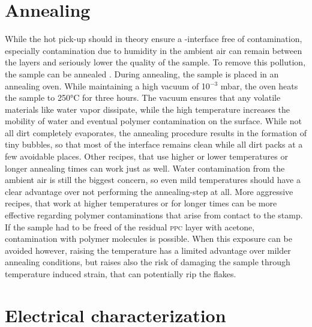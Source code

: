 \section{Annealing}

While the hot pick-up should in theory ensure a \hbn-\tmdg interface free of contamination, especially contamination due to humidity in the ambient air can remain between the layers and seriously lower the quality of the sample. To remove this pollution, the sample can be annealed \cite{lin_graphene_2012}. During annealing, the sample is placed in an annealing oven. While maintaining a high vacuum of 10$^{-3}$ mbar, the oven heats the sample to 250°C for three hours. The vacuum ensures that any volatile materials like water vapor dissipate, while the high temperature increases the mobility of water and eventual polymer contamination on the surface. While not all dirt completely evaporates, the annealing procedure results in the formation of tiny bubbles, so that most of the interface remains clean while all dirt packs at a few avoidable places. Other recipes, that use higher or lower temperatures or longer annealing times can work just as well. Water contamination from the ambient air is still the biggest concern, so even mild temperatures should have a clear advantage over not performing the annealing-step at all. 
More aggressive recipes, that work at higher temperatures or for longer times can be more effective regarding polymer contaminations that arise from contact to the stamp. If the sample had to be freed of the residual \textsc{ppc} layer with acetone, contamination with polymer molecules is possible. When this exposure can be avoided however, raising the temperature has a limited advantage over milder annealing conditions, but raises also the risk of damaging the sample through temperature induced strain, that can potentially rip the \tmdg flakes. 

\section{Electrical characterization}

